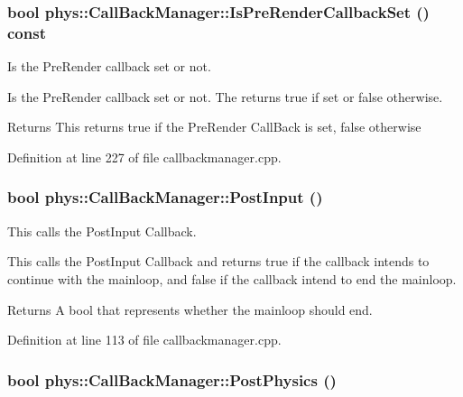 \hypertarget{classphys_1_1CallBackManager_a91017cc0aa4a04e74fd8f9ca0895b6f8}{
\subsubsection[{IsPreRenderCallbackSet}]{\setlength{\rightskip}{0pt plus 5cm}bool phys::CallBackManager::IsPreRenderCallbackSet () const}}
\label{d1/d47/classphys_1_1CallBackManager_a91017cc0aa4a04e74fd8f9ca0895b6f8}


Is the PreRender callback set or not. 

Is the PreRender callback set or not. The returns true if set or false otherwise. \begin{DoxyReturn}{Returns}
This returns true if the PreRender CallBack is set, false otherwise 
\end{DoxyReturn}


Definition at line 227 of file callbackmanager.cpp.

\hypertarget{classphys_1_1CallBackManager_a83afb36cfc7e71863d68a8b4c1d5e9d2}{
\subsubsection[{PostInput}]{\setlength{\rightskip}{0pt plus 5cm}bool phys::CallBackManager::PostInput ()}}
\label{d1/d47/classphys_1_1CallBackManager_a83afb36cfc7e71863d68a8b4c1d5e9d2}


This calls the PostInput Callback. 

This calls the PostInput Callback and returns true if the callback intends to continue with the mainloop, and false if the callback intend to end the mainloop. \begin{DoxyReturn}{Returns}
A bool that represents whether the mainloop should end. 
\end{DoxyReturn}


Definition at line 113 of file callbackmanager.cpp.

\hypertarget{classphys_1_1CallBackManager_a06bf0e8787f21caf31bf428727155084}{
\subsubsection[{PostPhysics}]{\setlength{\rightskip}{0pt plus 5cm}bool phys::CallBackManager::PostPhysics ()}}
\label{d1/d47/classphys_1_1CallBackManager_a06bf0e8787f21caf31bf428727155084}


